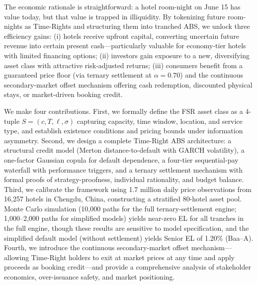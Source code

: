 \documentclass[12pt,a4paper]{article}
\begin{document}
The economic rationale is straightforward: a hotel room-night on June 15 has value today, but that value is trapped in illiquidity.
By tokenizing future room-nights as Time-Rights and structuring them into tranched ABS, we unlock three efficiency gains: (i) hotels receive upfront capital, converting uncertain future revenue into certain present cash---particularly valuable for economy-tier hotels with limited financing options; (ii) investors gain exposure to a new, diversifying asset class with attractive risk-adjusted returns; (iii) consumers benefit from a guaranteed price floor (via ternary settlement at $\alpha=0.70$) and the continuous secondary-market offset mechanism offering cash redemption, discounted physical stays, or market-driven booking credit.

We make four contributions.
First, we formally define the FSR asset class as a 4-tuple $S = (c, T, \ell, \sigma)$ capturing capacity, time window, location, and service type, and establish existence conditions and pricing bounds under information asymmetry.
Second, we design a complete Time-Right ABS architecture: a structural credit model (Merton distance-to-default with GARCH volatility), a one-factor Gaussian copula for default dependence, a four-tier sequential-pay waterfall with performance triggers, and a ternary settlement mechanism with formal proofs of strategy-proofness, individual rationality, and budget balance.
Third, we calibrate the framework using 1.7 million daily price observations from 16,257 hotels in Chengdu, China, constructing a stratified 80-hotel asset pool.
Monte Carlo simulation (10,000 paths for the full ternary-settlement engine; 1,000--2,000 paths for simplified models) yields near-zero EL for all tranches in the full engine, though these results are sensitive to model specification, and the simplified default model (without settlement) yields Senior EL of 1.20\% (Baa--A).
Fourth, we introduce the continuous secondary-market offset mechanism---allowing Time-Right holders to exit at market prices at any time and apply proceeds as booking credit---and provide a comprehensive analysis of stakeholder economics, over-issuance safety, and market positioning.
\end{document}
